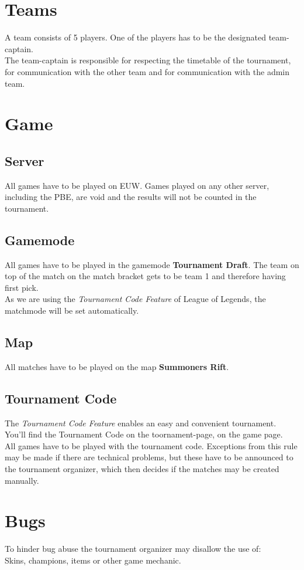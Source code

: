 \documentclass{article}
\begin{document}
\section{Teams}
A team consists of 5 players. One of the players has to be the designated team-captain.
\\
The team-captain is responsible for respecting the timetable of the tournament, for communication with the other team and for communication with the admin team.

\section{Game}
\subsection{Server}
All games have to be played on EUW. Games played on any other server, including the PBE, are void and the results will not be counted in the tournament.

\subsection{Gamemode}
All games have to be played in the gamemode \textbf{Tournament Draft}. The team on top of the match on the match bracket gets to be team 1 and therefore having first pick. 
\\
As we are using the \textit{Tournament Code Feature} of League of Legends, the matchmode will be set automatically.
\subsection{Map}
All matches have to be played on the map \textbf{Summoners Rift}.

\subsection{Tournament Code}
The \textit{Tournament Code Feature} enables an easy and convenient tournament. You'll find the Tournament Code on the toornament-page, on the game page. 
\\
All games have to be played with the tournament code. Exceptions from this rule may be made if there are technical problems, but these have to be announced to the tournament organizer, which then decides if the matches may be created manually.



\section{Bugs}
To hinder bug abuse the tournament organizer may disallow the use of:\\
Skins, champions, items or other game mechanic.
\end{document}
